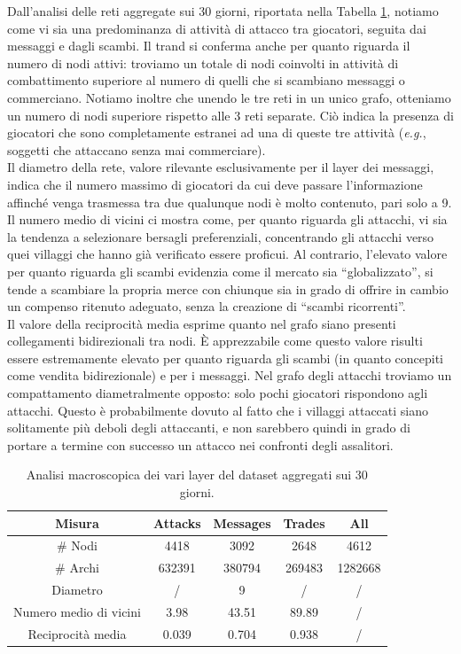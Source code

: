 Dall'analisi delle reti aggregate sui 30 giorni, riportata nella Tabella \ref{tab:summary}, notiamo come vi sia una predominanza di attività di attacco tra giocatori, seguita dai messaggi e dagli scambi. Il trand si conferma anche per quanto riguarda il numero di nodi attivi: troviamo un totale di nodi coinvolti in attività di combattimento superiore al numero di quelli che si scambiano messaggi o commerciano. Notiamo inoltre che unendo le tre reti in un unico grafo, otteniamo un numero di nodi superiore rispetto alle 3 reti separate. Ciò indica la presenza di giocatori che sono completamente estranei ad una di queste tre attività (\textit{e.g.}, soggetti che attaccano senza mai commerciare).\\
Il diametro della rete, valore rilevante esclusivamente per il layer dei messaggi, indica che il numero massimo di giocatori da cui deve passare l'informazione affinché venga trasmessa tra due qualunque nodi è molto contenuto, pari solo a 9.\\
Il numero medio di vicini ci mostra come, per quanto riguarda gli attacchi, vi sia la tendenza a selezionare bersagli preferenziali, concentrando gli attacchi verso quei villaggi che hanno già verificato essere proficui. Al contrario, l'elevato valore per quanto riguarda gli scambi evidenzia come il mercato sia “globalizzato”, si tende a scambiare la propria merce con chiunque sia in grado di offrire in cambio un compenso ritenuto adeguato, senza la creazione di  “scambi ricorrenti”.\\
Il valore della reciprocità media esprime quanto nel grafo siano presenti collegamenti bidirezionali tra nodi. È apprezzabile come questo valore risulti essere estremamente elevato per quanto riguarda gli scambi (in quanto concepiti come vendita bidirezionale) e per i messaggi. Nel grafo degli attacchi troviamo un compattamento diametralmente opposto: solo pochi giocatori rispondono agli attacchi. Questo è probabilmente dovuto al fatto che i villaggi attaccati siano solitamente più deboli degli attaccanti, e non sarebbero quindi in grado di portare a termine con successo un attacco nei confronti degli assalitori.
\begin{table}[h]
	\centering
	\caption{Analisi macroscopica dei vari layer del dataset aggregati sui 30 giorni.}
	\begin{tabular}{|c|c|c|c|c|}
		\hline 
		Misura & Attacks & Messages & Trades & All \\ 
		\hline 
		\# Nodi & 4418 & 3092 & 2648 & 4612 \\ 
		\hline 
		\# Archi & 632391 & 380794 & 269483 & 1282668 \\ 
		\hline 
		Diametro & / & 9 & / & / \\ 
		\hline 
		Numero medio di vicini & 3.98 & 43.51 & 89.89 & / \\ 
		\hline 
		Reciprocità media & 0.039 & 0.704 & 0.938 & / \\ 
		\hline 
	\end{tabular} 
	\label{tab:summary}
\end{table}

